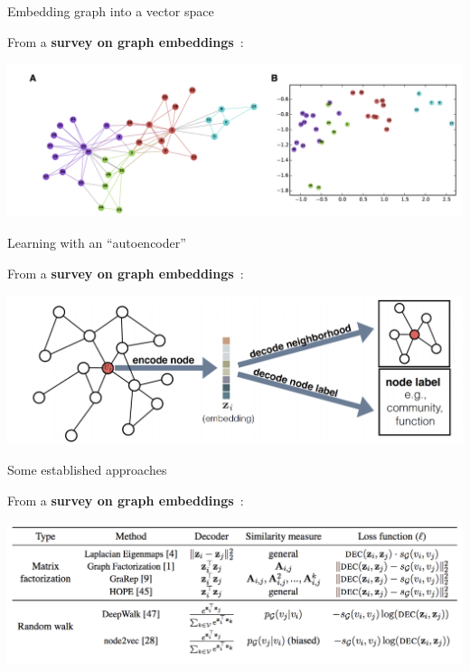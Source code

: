 \begin{frame}{Embedding graph into a vector space}

From a \textbf{survey on graph embeddings}~\cite{hamilton2017representation}:

\begin{center}
	\includegraphics[width=\textwidth]{figures/ge-fig1}
\end{center}

	
\end{frame}



\begin{frame}{Learning with an ``autoencoder''}

From a \textbf{survey on graph embeddings}~\cite{hamilton2017representation}:

\begin{center}
	\includegraphics[width=\textwidth]{figures/ge-fig2}
\end{center}

	
\end{frame}




\begin{frame}{Some established approaches}

From a \textbf{survey on graph embeddings}~\cite{hamilton2017representation}:

\begin{center}
	\includegraphics[width=\textwidth]{figures/ge-fig3}
\end{center}

	
\end{frame}





